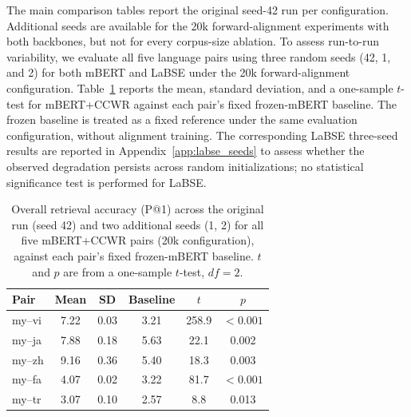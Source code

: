 \documentclass[11pt]{article}
\begin{document}
The main comparison tables report the original seed-42 run per configuration. Additional seeds are available for the 20k forward-alignment experiments with both backbones, but not for every corpus-size ablation. To assess run-to-run variability, we evaluate all five language pairs using three random seeds (42, 1, and 2) for both mBERT and LaBSE under the 20k forward-alignment configuration. Table~\ref{tab:significance} reports the mean, standard deviation, and a one-sample $t$-test for mBERT+CCWR against each pair's fixed frozen-mBERT baseline. The frozen baseline is treated as a fixed reference under the same evaluation configuration, without alignment training. The corresponding LaBSE three-seed results are reported in Appendix~\ref{app:labse_seeds} to assess whether the observed degradation persists across random initializations; no statistical significance test is performed for LaBSE.

\begin{table}[h]
\centering
\small
\caption{Overall retrieval accuracy (P@1) across the original run (seed 42) and two additional seeds (1, 2) for all five mBERT+CCWR pairs (20k configuration), against each pair's fixed frozen-mBERT baseline. $t$ and $p$ are from a one-sample $t$-test, $df=2$.}
\label{tab:significance}
\begin{tabular}{lccccc}
\toprule
\textbf{Pair} & \textbf{Mean} & \textbf{SD} & \textbf{Baseline} & \textbf{$t$} & \textbf{$p$} \\
\midrule
my--vi & 7.22 & 0.03 & 3.21 & 258.9 & $<0.001$ \\
my--ja & 7.88 & 0.18 & 5.63 & 22.1  & 0.002 \\
my--zh & 9.16 & 0.36 & 5.40 & 18.3  & 0.003 \\
my--fa & 4.07 & 0.02 & 3.22 & 81.7  & $<0.001$ \\
my--tr & 3.07 & 0.10 & 2.57 & 8.8   & 0.013 \\
\bottomrule
\end{tabular}
\end{table}
\end{document}
